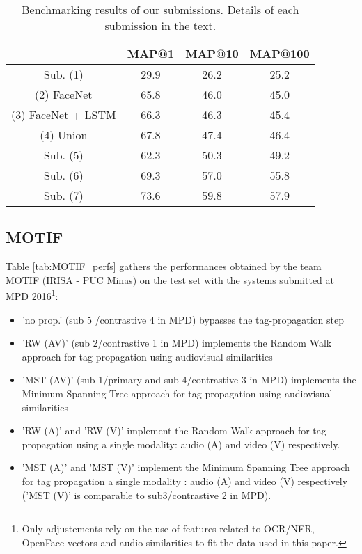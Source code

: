 \begin{table}[tb]
\centering
\begin{tabular}{c|c|c|c|}
\cline{2-4}
                                & MAP@1  & MAP@10 & MAP@100  \\ \hline
 \multicolumn{1}{|c|}{Sub. (1)} & 29.9   & 26.2   & 25.2 \\ \hline \hline
 \multicolumn{1}{|c|}{(2) FaceNet} & 65.8   & 46.0   & 45.0 \\ \hline
 \multicolumn{1}{|c|}{(3) FaceNet + LSTM} & 66.3   & 46.3   & 45.4 \\ \hline
 \multicolumn{1}{|c|}{(4) Union} & 67.8   & 47.4   & 46.4 \\ \hline
 \hline
 \multicolumn{1}{|c|}{Sub. (5)} & 62.3   & 50.3   & 49.2 \\ \hline
 \multicolumn{1}{|c|}{Sub. (6)} & 69.3   & 57.0   & 55.8 \\ \hline
 \multicolumn{1}{|c|}{Sub. (7)} & 73.6   & 59.8   & 57.9 \\ \hline

\end{tabular}
\vspace*{-2mm}
\caption{Benchmarking results of our submissions. Details of each submission in the text.}
\vspace*{-2mm}
\label{tab:mediaeval}
\end{table}

\subsection{MOTIF}

Table \ref{tab:MOTIF_perfs} gathers the performances obtained by the team MOTIF (IRISA - PUC Minas) on the test set with the systems submitted at MPD 2016\footnote{Only adjustements rely on the use of features related to OCR/NER, OpenFace vectors and audio similarities to fit the data used in this paper.}:
\begin{itemize}
  \item 'no prop.' (sub 5 /contrastive 4 in MPD) bypasses the tag-propagation step
  \item 'RW (AV)' (sub 2/contrastive 1 in MPD) implements the Random Walk approach for tag propagation using audiovisual similarities
  \item 'MST (AV)' (sub 1/primary and sub 4/contrastive 3 in MPD) implements the Minimum Spanning Tree approach for tag propagation using audiovisual similarities
  \item 'RW (A)' and  'RW (V)' implement the Random Walk approach for tag propagation using a single modality: audio (A) and video (V) respectively.
  \item 'MST (A)' and  'MST (V)' implement the Minimum Spanning Tree approach for tag propagation a single modality : audio (A) and video (V) respectively ('MST (V)' is comparable to sub3/contrastive 2 in MPD).
\end{itemize}

